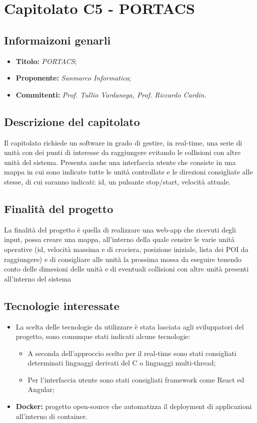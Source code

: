 \section{Capitolato C5 - PORTACS}
\subsection{Informaizoni genarli}
\begin{itemize}
    \item \textbf{Titolo:} \textit{PORTACS};
    \item \textbf{Proponente:} \textit{Sanmarco Informatica};
    \item \textbf{Commitenti:} \textit{Prof. Tullio Vardanega, Prof. Riccardo Cardin}.
\end{itemize}
\subsection{Descrizione del capitolato}
Il capitolato richiede un software in grado di gestire, in real-time, una serie di unità con dei punti di interesse da raggiungere evitando le collisioni con altre unità del sistema. 
Presenta anche una interfaccia utente che consiste in una mappa in cui sono indicate tutte le unità controllate e le direzioni consigliate alle stesse, 
di cui saranno indicati: id, un pulsante stop/start, velocità attuale.
\subsection{Finalità del progetto}
La finalità del progetto è quella di realizzare una web-app che ricevuti degli input, possa creare una mappa, all'interno della quale censire le varie unità operative 
(id, velocità massima e di crociera, posizione iniziale, lista dei POI da raggiungere) e di consigliare 
alle unità la prossima mossa da eseguire tenendo conto delle dimesioni delle unità e di eventuali collisioni con altre unità presenti all'interno del sistema 
\subsection{Tecnologie interessate}
\begin{itemize}
    \item La scelta delle tecnologie da utilizzare è stata lasciata agli sviluppatori del progetto, sono comunque stati indicati alcune tecnologie:
    \begin{itemize}
        \item A seconda dell'approccio scelto per il real-time sono stati consigliati determinati linguaggi derivati del C o linguaggi multi-thread;
        \item Per l'interfaccia utente sono stati consigliati framework come React ed Angular;
    \end{itemize}
    \item \textbf{Docker:} progetto open-source che automatizza il deployment di applicazioni all’interno di container.
\end{itemize}
